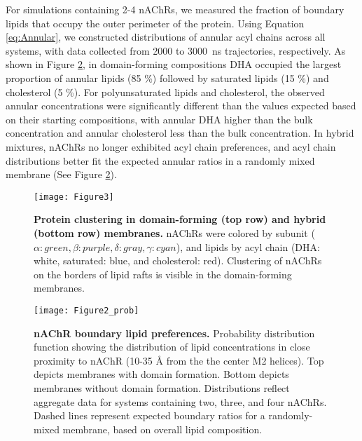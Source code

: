 For simulations containing 2-4 nAChRs, we measured the fraction of boundary lipids that occupy the outer perimeter of the protein. Using Equation \ref{eq:Annular}, we constructed distributions of annular acyl chains across all systems, with data collected from 2000 to 3000~ns trajectories, respectively. As shown in Figure \ref{fig:Figure2}, in domain-forming compositions DHA occupied the largest proportion of annular lipids (85 \%) followed by saturated lipids (15 \%) and cholesterol (5 \%). For polyunsaturated lipids and cholesterol, the observed annular concentrations were significantly different than the values expected based on their starting compositions, with annular DHA higher than the bulk concentration and annular cholesterol less than the bulk concentration.  In hybrid mixtures, nAChRs no longer exhibited acyl chain preferences, and acyl chain distributions better fit the expected annular ratios in a randomly mixed membrane (See Figure \ref{fig:Figure2}).

\begin{figure}[h]
\center
\texttt{[image: Figure3]}
\caption[Protein clustering in domain-forming (top row) and hybrid (bottom row) membranes.]{{\bf Protein clustering in domain-forming (top row) and hybrid (bottom row) membranes.} nAChRs were colored by subunit ($\alpha:green,\beta:purple,\delta:gray,\gamma:cyan$), and lipids by acyl chain (DHA: white, saturated: blue, and cholesterol: red). Clustering of nAChRs on the borders of lipid rafts is visible in the domain-forming membranes.}
\label{fig:Figure4}
\end{figure}



\begin{figure}[h]
\centering
\texttt{[image: Figure2\_prob]}
\caption[nAChR boundary lipid preferences.]{{\bf nAChR boundary lipid preferences.} Probability distribution function showing the distribution of lipid concentrations in close proximity to nAChR (10-35 {\AA}  from the the center M2 helices). Top depicts membranes with domain formation. Bottom depicts membranes without domain formation. Distributions reflect aggregate data for systems containing two, three, and four nAChRs. Dashed lines represent expected boundary ratios for a randomly-mixed membrane, based on overall lipid composition.}
  \label{fig:Figure2}
\end{figure}





